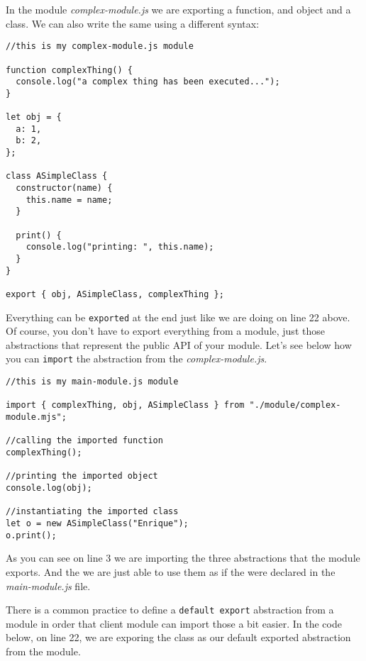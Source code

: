 \documentclass[a4paper, oneside, titlepage, 12pt]{book}
\begin{document}
In the module \textit{complex-module.js} we are exporting a function, and object and a class. We can also write the same using a different syntax:

\begin{verbatim}
//this is my complex-module.js module

function complexThing() {
  console.log("a complex thing has been executed...");
}

let obj = {
  a: 1,
  b: 2,
};

class ASimpleClass {
  constructor(name) {
    this.name = name;
  }

  print() {
    console.log("printing: ", this.name);
  }
}

export { obj, ASimpleClass, complexThing };
\end{verbatim}

Everything can be \texttt{exported} at the end just like we are doing on line 22 above. Of course, you don't have to export everything from a module, just those abstractions that represent the public API of your module. Let's see below how you can \texttt{import} the abstraction from the \textit{complex-module.js}.

\begin{verbatim}
//this is my main-module.js module

import { complexThing, obj, ASimpleClass } from "./module/complex-module.mjs";

//calling the imported function
complexThing();

//printing the imported object
console.log(obj);

//instantiating the imported class
let o = new ASimpleClass("Enrique");
o.print();
\end{verbatim}

As you can see on line 3 we are importing the three abstractions that the module exports. And the we are just able to use them as if the were declared in the \textit{main-module.js} file.

There is a common practice to define a \texttt{default export} abstraction from a module in order that client module can import those a bit easier. In the code below, on line 22, we are exporing the class as our default exported abstraction from the module.
\end{document}
